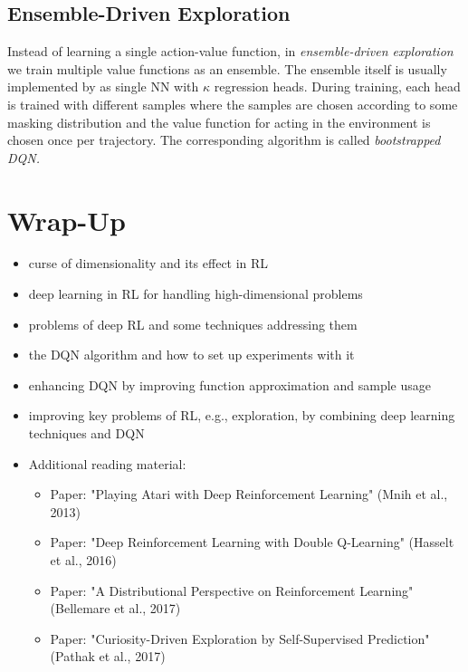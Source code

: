 		\subsection{Ensemble-Driven Exploration}
			Instead of learning a single action-value function, in \emph{ensemble-driven exploration} we train multiple value functions as an ensemble. The ensemble itself is usually implemented by as single \ac{NN} with \(\kappa\) regression heads. During training, each head is trained with different samples where the samples are chosen according to some masking distribution and the value function for acting in the environment is chosen once per trajectory. The corresponding algorithm is called \emph{bootstrapped \ac{DQN}.}

	\section{Wrap-Up}
		\begin{itemize}
			\item curse of dimensionality and its effect in \ac{RL}
			\item deep learning in \ac{RL} for handling high-dimensional problems
			\item problems of deep \ac{RL} and some techniques addressing them
			\item the \ac{DQN} algorithm and how to set up experiments with it
			\item enhancing \ac{DQN} by improving function approximation and sample usage
			\item improving key problems of \ac{RL}, e.g., exploration, by combining deep learning techniques and \ac{DQN}
			\item Additional reading material:
				\begin{itemize}
					\item Paper: "Playing Atari with Deep Reinforcement Learning" (Mnih et al., 2013)  %
					\item Paper: "Deep Reinforcement Learning with Double Q-Learning" (Hasselt et al., 2016)  %
					\item Paper: "A Distributional Perspective on Reinforcement Learning" (Bellemare et al., 2017)  %
					\item Paper: "Curiosity-Driven Exploration by Self-Supervised Prediction" (Pathak et al., 2017)  %
				\end{itemize}
		\end{itemize}

